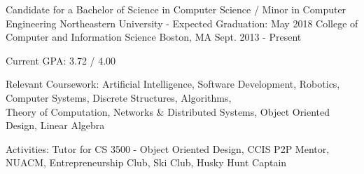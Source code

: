 


\begin{cventries}

  \cventry
    {Candidate for a Bachelor of Science in Computer Science / Minor in Computer Engineering} %
    {Northeastern University - Expected Graduation: May 2018 \newline College of Computer and Information Science} %
    {Boston, MA} %
    {Sept. 2013 - Present} %
    {
      \begin{cvitems} %
        \item {Current GPA: 3.72 / 4.00}
        \item {Relevant Coursework: Artificial Intelligence, Software Development, Robotics, Computer Systems, Discrete Structures, Algorithms,\\
            \hspace*{3.11cm} Theory of Computation, Networks \& Distributed Systems, Object Oriented Design, Linear Algebra}
        \item {Activities: Tutor for CS 3500 - Object Oriented Design, CCIS P2P Mentor, NUACM, Entrepreneurship Club, Ski Club, Husky Hunt Captain}
      \end{cvitems}
    }

\end{cventries}
